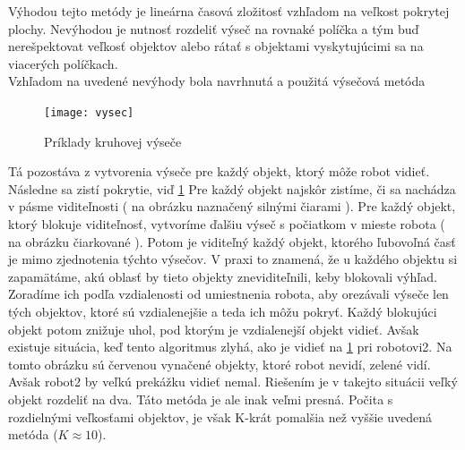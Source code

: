 Výhodou tejto metódy je lineárna časová zložitosť vzhľadom na veľkost pokrytej plochy. Nevýhodou je nutnosť rozdeliť výseč na rovnaké políčka a tým buď nerešpektovat veľkosť objektov alebo rátať s objektami vyskytujúcimi sa na viacerých políčkach. \\
Vzhľadom na uvedené nevýhody bola navrhnutá a použitá výsečová metóda
\begin{figure}
\centering
\texttt{[image: vysec]}
\caption{Príklady kruhovej výseče}
\label{fig:vysec}
\end{figure}
Tá pozostáva z vytvorenia výseče pre každý objekt, ktorý môže robot vidieť. Následne sa zistí pokrytie, viď \ref{fig:vysec} Pre každý objekt najskôr zistíme, či sa nachádza v pásme viditeľnosti ( na obrázku naznačený silnými čiarami ). Pre každý objekt, ktorý blokuje viditeľnosť, vytvoríme ďalšiu výseč s počiatkom v mieste robota ( na obrázku čiarkované ). Potom je viditeľný každý objekt, ktorého ľubovoľná časť je mimo zjednotenia týchto výsečov. V praxi to znamená, že u každého objektu si zapamätáme, akú oblasť by tieto objekty zneviditeľnili, keby blokovali výhľad. Zoradíme ich podľa vzdialenosti od umiestnenia robota, aby orezávali výseče len tých objektov, ktoré sú vzdialenejšie a teda ich môžu pokryť. Každý blokujúci objekt potom znižuje uhol, pod ktorým je vzdialenejší objekt vidieť. Avšak existuje situácia, keď tento algoritmus zlyhá, ako je vidieť na \ref{fig:vysec} pri robotovi2. Na tomto obrázku sú červenou vynačené objekty, ktoré robot nevidí, zelené vidí. Avšak robot2 by veľkú prekážku vidieť nemal. Riešením je v takejto situácii veľký objekt rozdeliť na dva. Táto metóda je ale inak veľmi presná. Počita s rozdielnými veľkosťami objektov, je však K-krát pomalšia než vyššie uvedená metóda ($K \approx 10$).
